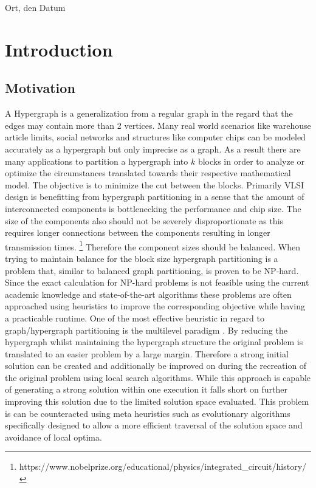 \documentclass[a4paper,12pt,titlepage, BCOR7mm,headsepline]{scrbook}
\numberwithin{equation}{section}
\begin{document}
\bigskip
\vspace*{1cm}
\noindent
Ort, den Datum

\clearpage

\tableofcontents
\clearpage
\clearpage
\mainmatter
\pagestyle{plain}
\chapter{Introduction}
\pagestyle{headings}
\section{Motivation}
A Hypergraph is a generalization from a regular graph in the regard that the edges may contain more than 2 vertices.
Many real world scenarios like warehouse article limits, social networks and structures like computer chips can be modeled accurately as a hypergraph but only imprecise as a graph. As a result there are many applications to partition a hypergraph into $k$ blocks in order to analyze or optimize the circumstances translated towards their respective mathematical model. The objective is to minimize the cut between the blocks. Primarily VLSI design is benefitting from hypergraph partitioning in a sense that the amount of interconnected components is bottlenecking the performance and chip size\cite{boese1992high}.  The size of the components also should not be severely disproportionate as this requires longer connections between the components resulting in longer transmission times. \footnote{https://www.nobelprize.org/educational/physics/integrated\_circuit/history/} Therefore the component sizes should be balanced.
When trying to maintain balance for the block size hypergraph partitioning is a problem that, similar to balanced graph partitioning, is proven to be NP-hard\cite{garey2002computers}. Since the exact calculation for NP-hard problems is not feasible using the current academic knowledge and state-of-the-art algorithms these problems are often approached using heuristics to improve the corresponding objective while having a practicable runtime. One of the most effective heuristic in regard to graph/hypergraph partitioning is the multilevel paradigm \cite{bulucc2016recent}. By reducing the hypergraph whilst maintaining the hypergraph structure the original problem is translated to an easier problem by a large margin. Therefore a strong initial solution can be created and additionally be improved on during the recreation of the original problem using local search algorithms. While this approach is capable of generating a strong solution within one execution it falls short on further improving this solution due to the limited solution space evaluated. This problem is can be counteracted using meta heuristics such as evolutionary algorithms specifically designed to allow a more efficient traversal of the solution space and avoidance of local optima. 
\end{document}
